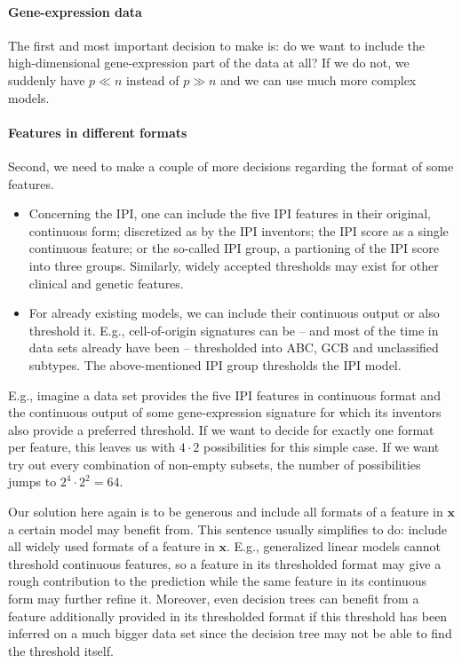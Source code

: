 \paragraph{Gene-expression data}
The first and most important decision to make is: do we want to include the high-dimensional
gene-expression part of the data at all? If we do not, we suddenly have $p \ll n$ instead of 
$p \gg n$ and we can use much more complex models. 

\paragraph{Features in different formats}
Second, we need to make a couple of more decisions regarding the format of some features.
\begin{itemize}
    \item Concerning the IPI, one can include the five IPI features in their original, continuous 
        form; discretized as by the IPI inventors; the IPI score as a single continuous feature; 
        or the so-called IPI group, a partioning of the IPI score into three groups. Similarly, 
        widely accepted thresholds may exist for other clinical and genetic features.
    \item For already existing models, we can include their continuous output or also threshold 
        it. E.g., cell-of-origin signatures can be -- and most of the time in data sets already 
        have been -- thresholded into ABC, GCB and unclassified subtypes. The above-mentioned IPI 
        group thresholds the IPI model. 
\end{itemize}

E.g., imagine a data set provides the five IPI features in continuous format and the continuous output 
of some gene-expression signature for which 
its inventors also provide a preferred threshold. If we want to decide for exactly one format 
per feature, this leaves us with $4 \cdot 2$ possibilities for this simple case. If we want try out 
every combination of non-empty subsets, the number of possibilities jumps to $2^4 \cdot 2^2 = 
64$. 

Our solution here again is to be generous and include all formats of a feature in $\mathbf{x}$ a 
certain model may benefit from. This sentence usually 
simplifies to do: include all widely used formats of a feature in $\mathbf{x}$. E.g., generalized linear models
cannot threshold continuous features, so a feature in its thresholded format may give a rough 
contribution to the prediction while the same feature in its continuous form may further refine it.
Moreover, even decision trees can benefit from a feature additionally provided in its thresholded 
format if this threshold has been inferred on a much bigger data set since the decision tree 
may not be able to find the threshold itself.

